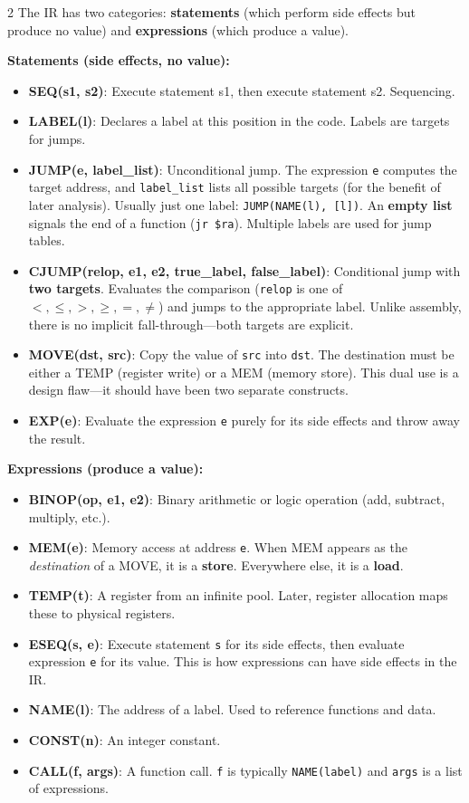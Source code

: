 \documentclass[9pt,landscape]{extarticle}
\begin{document}
\begin{multicols}{2}
The IR has two categories: \textbf{statements} (which perform side effects but produce no value) and \textbf{expressions} (which produce a value).

\textbf{Statements (side effects, no value):}
\begin{itemize}
  \item \textbf{SEQ(s1, s2)}: Execute statement s1, then execute statement s2. Sequencing.
  \item \textbf{LABEL(l)}: Declares a label at this position in the code. Labels are targets for jumps.
  \item \textbf{JUMP(e, label\_list)}: Unconditional jump. The expression \texttt{e} computes the target address, and \texttt{label\_list} lists all possible targets (for the benefit of later analysis). Usually just one label: \texttt{JUMP(NAME(l), [l])}. An \textbf{empty list} signals the end of a function (\texttt{jr \$ra}). Multiple labels are used for jump tables.
  \item \textbf{CJUMP(relop, e1, e2, true\_label, false\_label)}: Conditional jump with \textbf{two targets}. Evaluates the comparison (\texttt{relop} is one of $<, \leq, >, \geq, =, \neq$) and jumps to the appropriate label. Unlike assembly, there is no implicit fall-through---both targets are explicit.
  \item \textbf{MOVE(dst, src)}: Copy the value of \texttt{src} into \texttt{dst}. The destination must be either a TEMP (register write) or a MEM (memory store). This dual use is a design flaw---it should have been two separate constructs.
  \item \textbf{EXP(e)}: Evaluate the expression \texttt{e} purely for its side effects and throw away the result.
\end{itemize}

\textbf{Expressions (produce a value):}
\begin{itemize}
  \item \textbf{BINOP(op, e1, e2)}: Binary arithmetic or logic operation (add, subtract, multiply, etc.).
  \item \textbf{MEM(e)}: Memory access at address \texttt{e}. When MEM appears as the \emph{destination} of a MOVE, it is a \textbf{store}. Everywhere else, it is a \textbf{load}.
  \item \textbf{TEMP(t)}: A register from an infinite pool. Later, register allocation maps these to physical registers.
  \item \textbf{ESEQ(s, e)}: Execute statement \texttt{s} for its side effects, then evaluate expression \texttt{e} for its value. This is how expressions can have side effects in the IR.
  \item \textbf{NAME(l)}: The address of a label. Used to reference functions and data.
  \item \textbf{CONST(n)}: An integer constant.
  \item \textbf{CALL(f, args)}: A function call. \texttt{f} is typically \texttt{NAME(label)} and \texttt{args} is a list of expressions.
\end{itemize}


\end{multicols}
\end{document}
